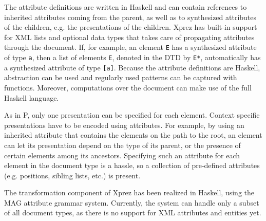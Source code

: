 \par  The attribute definitions are written in Haskell and can contain
        references to inherited attributes coming from the parent, as well as to
        synthesized attributes of the children, e.g. the presentations of the children.
        {\sc Xprez} has built-in support for XML lists and optional data types that
        takes care of propagating attributes through the document. If, for example, an
        element \texttt{E} has a synthesized attribute of type \texttt{a}, then a list
        of elements \texttt{E}, denoted in the DTD by \texttt{E*}, automatically has a
        synthesized attribute of type \texttt{[a]}. Because the attribute definitions
        are Haskell, abstraction can be used and regularly used patterns can be
        captured with functions. Moreover, computations over the document can make use
        of the full Haskell language.
\par As in P, only one presentation can be specified for each element.
        Context specific presentations have to be encoded using attributes. For
        example, by using an inherited attribute that contains the elements on the path
        to the root, an element can let its presentation depend on the type of its
        parent, or the presence of certain elements among its ancestors. Specifying
        such an attribute for each element in the document type is a hassle, so a
        collection of pre-defined attributes (e.g. positions, sibling lists, etc.) is
        present. 
\par The transformation component of {\sc Xprez} has been realized in
        Haskell, using the MAG attribute grammar system\cite{ag}. Currently,
        the system can handle only a subset of all document types, as there is no
        support for XML attributes and entities yet.
